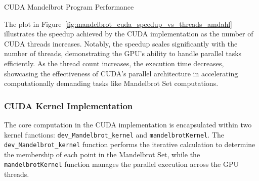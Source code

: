 \documentclass[
	report, %
	11pt, %
]{CSUniSchoolLabReport}
\newcounter{ct}
\begin{document}
\begin{table}[H]
	\captionsetup{justification=centering, width=.8\linewidth}
	\centering
	\caption{CUDA Mandelbrot Program Performance}
	\label{tab:cuda_performance}

	\begin{adjustbox}{max width=\textwidth}
		
	\end{adjustbox}
\end{table}


The plot in Figure~\ref{fig:mandelbrot_cuda_speedup_vs_threads_amdahl} illustrates the speedup achieved by the CUDA implementation as the number of CUDA threads increases. Notably, the speedup scales significantly with the number of threads, demonstrating the GPU's ability to handle parallel tasks efficiently. As the thread count increases, the execution time decreases, showcasing the effectiveness of CUDA's parallel architecture in accelerating computationally demanding tasks like Mandelbrot Set computations.

\subsubsection{CUDA Kernel Implementation}

The core computation in the CUDA implementation is encapsulated within two kernel functions: \texttt{dev\_Mandelbrot\_kernel} and \texttt{mandelbrotKernel}. The \texttt{dev\_Mandelbrot\_kernel} function performs the iterative calculation to determine the membership of each point in the Mandelbrot Set, while the \texttt{mandelbrotKernel} function manages the parallel execution across the GPU threads.
\end{document}
